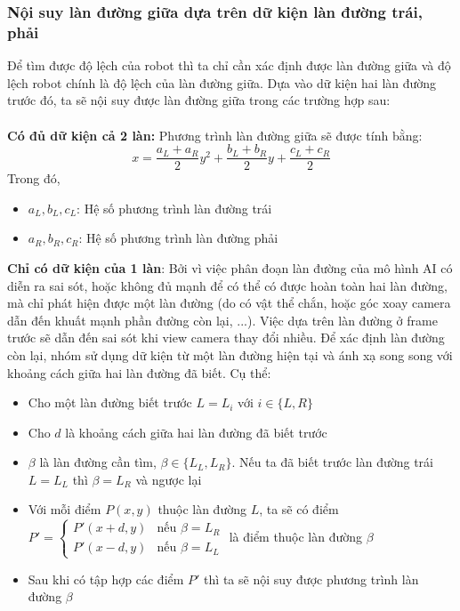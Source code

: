 \subsubsection{Nội suy làn đường giữa dựa trên dữ kiện làn đường trái, phải}
Để tìm được độ lệch của robot thì ta chỉ cần xác định được làn đường giữa và độ lệch robot chính là độ lệch của làn đường giữa. Dựa vào dữ kiện hai làn đường trước đó, ta sẽ nội suy được làn đường giữa trong các trường hợp sau:\\\\
\textbf{Có đủ dữ kiện cả 2 làn:} Phương trình làn đường giữa sẽ được tính bằng:
\begin{equation}
    x = \frac{a_L + a_R}{2}y^2 + \frac{b_L + b_R}{2}y + \frac{c_L + c_R}{2}
\end{equation}
Trong đó,
\begin{itemize}
    \item $a_L, b_L, c_L$: Hệ số phương trình làn đường trái
    \item $a_R, b_R, c_R$: Hệ số phương trình làn đường phải
\end{itemize}
\textbf{Chỉ có dữ kiện của 1 làn}: Bởi vì việc phân đoạn làn đường của mô hình AI có diễn ra sai sót, hoặc không đủ mạnh để có thể có được hoàn toàn hai làn đường, mà chỉ phát hiện được một làn đường (do có vật thể chắn, hoặc góc xoay camera dẫn đến khuất mạnh phần đường còn lại, ...). Việc dựa trên làn đường ở frame trước sẽ dẫn đến sai sót khi view camera thay đổi nhiều. Để xác định làn đường còn lại, nhóm sử dụng dữ kiện từ một làn đường hiện tại và ánh xạ song song với khoảng cách giữa hai làn đường đã biết. Cụ thể:
\begin{itemize}
    \item Cho một làn đường biết trước $L = L_i$ với $i \in \{L, R\}$
    \item Cho $d$ là khoảng cách giữa hai làn đường đã biết trước
    \item $\beta$ là làn đường cần tìm, $\beta \in \{L_L, L_R\}$. Nếu ta đã biết trước làn đường trái $L = L_L$ thì $\beta = L_R$ và ngược lại
    \item Với mỗi điểm $P(x, y)$ thuộc làn đường $L$, ta sẽ có điểm $P' = 
    \begin{cases}
        P'(x + d, y) & \text{nếu } \beta = L_R \\
        P'(x - d, y) & \text{nếu } \beta = L_L
    \end{cases}$
    là điểm thuộc làn đường $\beta$
    \item Sau khi có tập hợp các điểm $P'$ thì ta sẽ nội suy được phương trình làn đường $\beta$
\end{itemize}
\newpage
